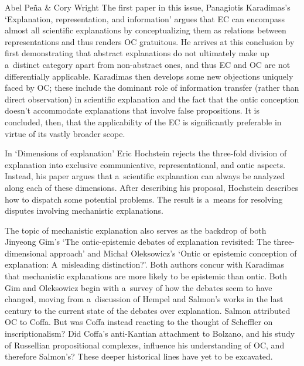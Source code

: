 \begin{editorialeng}{Abel Peña \& Cory Wright}
The first paper in this issue, Panagiotis Karadimas's `Explanation, representation, and information' argues that EC can encompass almost all scientific explanations by conceptualizing them as relations between representations and thus renders OC gratuitous. He arrives at this conclusion by first demonstrating that abstract explanations do not ultimately make up a~distinct category apart from non-abstract ones, and thus EC and OC are not differentially applicable. Karadimas then develops some new objections uniquely faced by OC; these include the dominant role of information transfer (rather than direct observation) in scientific explanation and the fact that the ontic conception doesn't accommodate explanations that involve false propositions. It is concluded, then, that the applicability of the EC is significantly preferable in virtue of its vastly broader scope.

In `Dimensions of explanation' Eric Hochstein rejects the three-fold division of explanation into exclusive communicative, representational, and ontic aspects. Instead, his paper argues that a~scientific explanation can always be analyzed along each of these dimensions. After describing his proposal, Hochstein describes how to dispatch some potential problems. The result is a~means for resolving disputes involving mechanistic explanations.

The topic of mechanistic explanation also serves as the backdrop of both Jinyeong Gim's `The ontic-epistemic debates of explanation revisited: The three-dimensional approach' and Michał Oleksowicz's `Ontic or epistemic conception of explanation: A~misleading distinction?'. Both authors concur with Karadimas that mechanistic explanations are more likely to be epistemic than ontic. Both Gim and Oleksowicz begin with a~survey of how the debates seem to have changed, moving from a~discussion of Hempel and Salmon's works in the last century to the current state of the debates over explanation. Salmon
\parencite*[][]{salmon_four_1989} %
 attributed OC to Coffa. But was Coffa instead reacting to the thought of Scheffler 
\parencite*[][]{scheffler_anatomy_1963} %
 on inscriptionalism? Did Coffa's anti-Kantian attachment to Bolzano, and his study of Russellian propositional complexes, influence his understanding of OC, and therefore Salmon's? These deeper historical lines have yet to be excavated.


\end{editorialeng}
